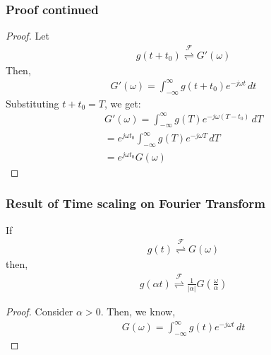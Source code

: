 \documentclass{beamer}
\providecommand{\brak}[1]{\ensuremath{\left(#1\right)}}
\providecommand{\fourier}{\overset{\mathcal{F}}{ \rightleftharpoons}}
\providecommand{\abs}[1]{\left\vert#1\right\vert}
\begin{document}
\begin{frame}[fragile]
\frametitle{Proof continued}
\begin{flushleft}

\begin{proof}
Let
\begin{align}
    g(t + t_0) \fourier G'(\omega)
\end{align}
Then, 
\begin{align}
    G'(\omega) = \int_{-\infty}^\infty g(t + t_0) e^{-j \omega t} \,dt
\end{align}
Substituting $t + t_0 = T$, we get:
\begin{align}
    G'(\omega) = \int_{-\infty}^\infty g(T) e^{-j \omega (T - t_0)} \,dT\\
      =e^{j \omega t_0} \int_{-\infty}^\infty g(T) e^{-j \omega T} \,dT\\
       = e^{j \omega t_0}G(\omega)
\end{align}
\end{proof}
\end{flushleft}
\end{frame}


\begin{frame}[fragile]
\frametitle{Result of Time scaling on Fourier Transform}
\begin{flushleft}
\begin{lemma}
If 
\begin{align}
    g(t) \fourier G(\omega)
\end{align}
then,
\begin{align}
    g(\alpha t) \fourier \frac{1}{\abs{\alpha}}G\brak{\frac{\omega}{\alpha}}
\end{align}
\label{scale}
\end{lemma}
\begin{proof}
Consider $\alpha > 0$. Then, we know, 
\begin{align}
    G(\omega) = \int_{-\infty}^\infty g(t) e^{-j \omega t} \,dt
\end{align}
\end{proof}
\end{flushleft}

\end{frame}
\end{document}
